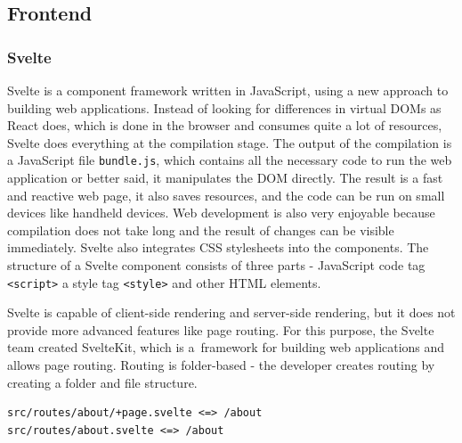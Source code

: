 







\subsection{Frontend}




\subsubsection{Svelte}

Svelte is a component framework written in JavaScript, using a new approach to building web applications. Instead of looking for differences in virtual DOMs as React does, which is done in the browser and consumes quite a lot of resources, Svelte does everything at the compilation stage. The output of the compilation is a JavaScript file \verb|bundle.js|, which contains all the necessary code to run the web application or better said, it manipulates the DOM directly. The result is a fast and reactive web page, it also saves resources, and the code can be run on small devices like handheld devices. Web development is also very enjoyable because compilation does not take long and the result of changes can be visible immediately. Svelte also integrates CSS stylesheets into the components. The structure of a Svelte component consists of three parts - JavaScript code tag \verb|<script>| a style tag \verb|<style>| and other HTML elements. 

Svelte is capable of client-side rendering and server-side rendering, but it does not provide more advanced features like page routing. For this purpose, the Svelte team created SvelteKit, which is a~framework for building web applications and allows page routing. Routing is folder-based - the developer creates routing by creating a folder and file structure.

\begin{verbatim}
src/routes/about/+page.svelte <=> /about
src/routes/about.svelte <=> /about
\end{verbatim}

